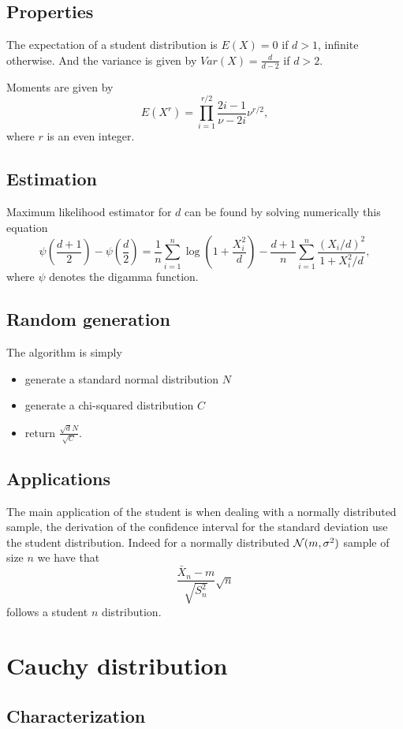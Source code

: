 \subsection{Properties}
The expectation of a student distribution is $E(X)=0$ if $d>1$, infinite otherwise. And the variance is given by $Var(X) = \frac{d}{d-2}$ if $d>2$.

Moments are given by
$$
E(X^r) = \prod_{i=1}^{r/2} \frac{2i-1}{\nu - 2i}\nu^{r/2},
$$
where $r$ is an even integer.

\subsection{Estimation}
Maximum likelihood estimator for $d$ can be found by solving numerically this equation
$$
\psi\left ( \frac{d+1}{2}\right) - \psi\left ( \frac{d}{2}\right) = \frac{1}{n}\sum_{i=1}^n\log\left(1+\frac{X_i^2}{d}\right) - \frac{d+1}{n} \sum_{i=1}^n \frac{(X_i/d)^2}{1+X_i^2/d},
$$
where $\psi$ denotes the digamma function.

\subsection{Random generation}
The algorithm is simply
\begin{itemize}
\item generate a standard normal distribution $N$
\item generate a chi-squared distribution $C$
\item return $\frac{\sqrt{d}N}{\sqrt{C}}$.
\end{itemize}

\subsection{Applications}
The main application of the student is when dealing with a normally distributed sample, the derivation of the  confidence interval for the standard deviation use the student distribution. Indeed for a normally distributed $\mathcal N(m,\sigma^2)$ sample of size $n$ we have that  
$$
\frac{\bar X_n-m}{\sqrt{S_n^2}}\sqrt{n}
$$ 
follows a student $n$ distribution.

\section{Cauchy distribution}
\subsection{Characterization}
